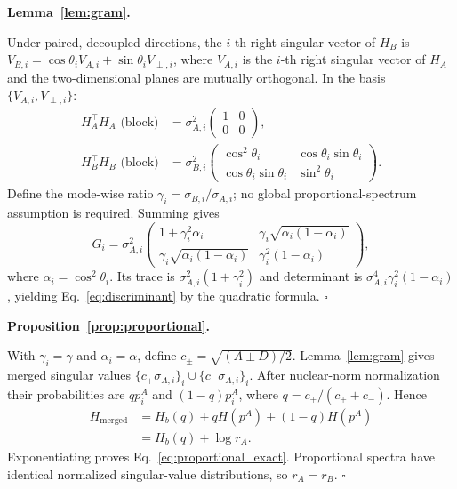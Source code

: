 \documentclass{article}
\begin{document}
\textbf{Lemma~\ref{lem:gram}.}

Under paired, decoupled directions, the $i$-th right singular vector of $H_B$ is
$V_{B,i}=\cos\theta_i V_{A,i}+\sin\theta_i V_{\perp,i}$,
where $V_{A,i}$ is the $i$-th right singular vector of $H_A$
and the two-dimensional planes are mutually orthogonal.
In the basis $\{V_{A,i},V_{\perp,i}\}$:
\begin{align}
  H_A^\top H_A \text{ (block)} &= \sigma_{A,i}^2\begin{pmatrix}1&0\\0&0\end{pmatrix}, \\
  H_B^\top H_B \text{ (block)} &= \sigma_{B,i}^2
    \begin{pmatrix}\cos^2\theta_i & \cos\theta_i\sin\theta_i \\
    \cos\theta_i\sin\theta_i & \sin^2\theta_i\end{pmatrix}.
\end{align}
Define the mode-wise ratio $\gamma_i=\sigma_{B,i}/\sigma_{A,i}$; no
global proportional-spectrum assumption is required.  Summing gives
\begin{equation}
  G_i = \sigma_{A,i}^2\begin{pmatrix}1+\gamma_i^2\alpha_i & \gamma_i\sqrt{\alpha_i(1-\alpha_i)} \\
    \gamma_i\sqrt{\alpha_i(1-\alpha_i)} & \gamma_i^2(1-\alpha_i)\end{pmatrix},
\end{equation}
where $\alpha_i=\cos^2\theta_i$.
Its trace is $\sigma_{A,i}^2(1+\gamma_i^2)$ and determinant is
$\sigma_{A,i}^4\gamma_i^2(1-\alpha_i)$, yielding
Eq.~\eqref{eq:discriminant} by the quadratic formula. $\square$

\textbf{Proposition~\ref{prop:proportional}.}

With $\gamma_i=\gamma$ and $\alpha_i=\alpha$, define
$c_\pm=\sqrt{(A\pm D)/2}$.  Lemma~\ref{lem:gram} gives merged
singular values $\{c_+\sigma_{A,i}\}_i\cup\{c_-\sigma_{A,i}\}_i$.
After nuclear-norm normalization their probabilities are
$q p_i^A$ and $(1-q)p_i^A$, where
$q=c_+/(c_++c_-)$.  Hence
\begin{align}
 H_{\mathrm{merged}}
 &=H_b(q)+qH(p^A)+(1-q)H(p^A)\\
 &=H_b(q)+\log r_A.
\end{align}
Exponentiating proves Eq.~\eqref{eq:proportional_exact}.  Proportional
spectra have identical normalized singular-value distributions, so
$r_A=r_B$. $\square$
\end{document}
